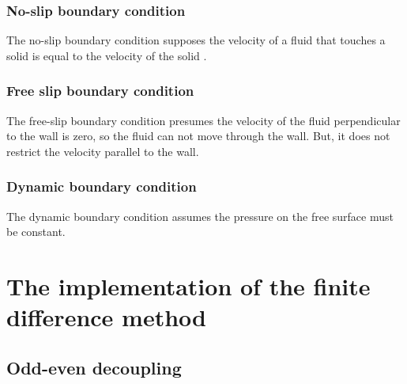 \documentclass{article}
\begin{document}
\subsubsection{No-slip boundary condition} \label{no-slip boundary condition}
The no-slip boundary condition supposes the velocity of a fluid that touches a solid is equal to the velocity of the solid \cite{no-slip boundary condition}.
\subsubsection{Free slip boundary condition}
The free-slip boundary condition presumes the velocity of the fluid perpendicular to the wall is zero, so the fluid can not move through the wall. But, it does not restrict the velocity parallel to the wall.\cite{free slip boundary condition} 
\subsubsection{Dynamic boundary condition}
The dynamic boundary condition assumes the pressure on the free surface must be constant.
\newpage
\section{The implementation of the finite difference method}
\subsection{Odd-even decoupling} \label{odd-even}
\end{document}
